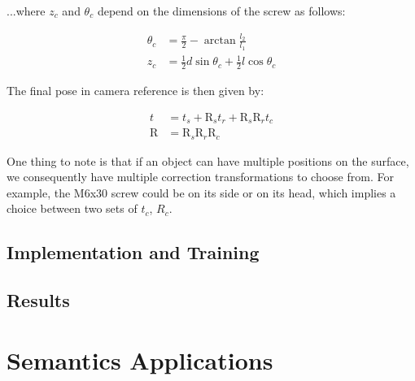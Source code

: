 ...where $z_c$ and $\theta_c$ depend on the dimensions of the screw as follows:

\begin{align*}
    \theta_c &= \frac{\pi}{2} - \arctan \frac{l_2}{l_1}\\
    z_c &= \frac{1}{2}d \sin \theta_c + \frac{1}{2} l \cos \theta_c
\end{align*}

The final pose in camera reference is then given by:

\begin{align*}
    t &= t_s + \text{R}_s t_r + \text{R}_s \text{R}_r t_c\\
    \text{R} &= \text{R}_s \text{R}_r \text{R}_c
\end{align*}

One thing to note is that if an object can have multiple positions on the surface, we consequently have multiple correction transformations to choose from. For example, the M6x30 screw could be on its side or on its head, which implies a choice between two sets of $t_c$, $R_c$.

\subsection{Implementation and Training}

\subsection{Results}

\section{Semantics Applications}